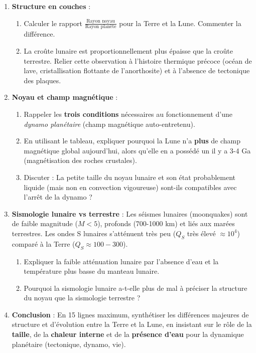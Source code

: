 \documentclass[11pt]{article}
\begin{document}
\begin{exercice}
\begin{enumerate}
    \item \textbf{Structure en couches} :
    \begin{enumerate}
        \item Calculer le rapport $\frac{\text{Rayon noyau}}{\text{Rayon planète}}$ pour la Terre et la Lune. Commenter la différence.
        \item La croûte lunaire est proportionnellement plus épaisse que la croûte terrestre. Relier cette observation à l'histoire thermique précoce (océan de lave, cristallisation flottante de l'anorthosite) et à l'absence de tectonique des plaques.
    \end{enumerate}
    \item \textbf{Noyau et champ magnétique} :
    \begin{enumerate}
        \item Rappeler les \textbf{trois conditions} nécessaires au fonctionnement d'une \emph{dynamo planétaire} (champ magnétique auto-entretenu).
        \item En utilisant le tableau, expliquer pourquoi la Lune n'a \textbf{plus} de champ magnétique global aujourd'hui, alors qu'elle en a possédé un il y a 3-4 Ga (magnétisation des roches crustales).
        \item Discuter : La petite taille du noyau lunaire et son état probablement liquide (mais non en convection vigoureuse) sont-ils compatibles avec l'arrêt de la dynamo ?
    \end{enumerate}
    \item \textbf{Sismologie lunaire vs terrestre} :
    Les séismes lunaires (moonquakes) sont de faible magnitude ($M < 5$), profonds (700-1000 km) et liés aux marées terrestres. Les ondes S lunaires s'atténuent très peu ($Q_S$ très élevé $\approx 10^4$) comparé à la Terre ($Q_S \approx 100-300$).
    \begin{enumerate}
        \item Expliquer la faible atténuation lunaire par l'absence d'eau et la température plus basse du manteau lunaire.
        \item Pourquoi la sismologie lunaire a-t-elle plus de mal à préciser la structure du noyau que la sismologie terrestre ?
    \end{enumerate}
    \item \textbf{Conclusion} : En 15 lignes maximum, synthétiser les différences majeures de structure et d'évolution entre la Terre et la Lune, en insistant sur le rôle de la \textbf{taille}, de la \textbf{chaleur interne} et de la \textbf{présence d'eau} pour la dynamique planétaire (tectonique, dynamo, vie).
\end{enumerate}
\end{exercice}
\end{document}

